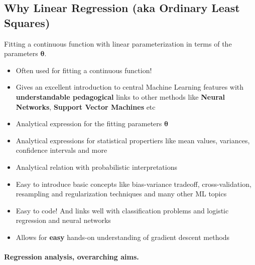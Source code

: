 \documentclass[%
oneside,                 %
final,                   %
10pt]{article}
\begin{document}
\subsection{Why Linear Regression (aka Ordinary Least Squares)}

Fitting a continuous function with linear parameterization in terms of the parameters  $\bm{\theta}$.
\begin{itemize}
\item Often used for fitting a continuous function!

\item Gives an excellent introduction to central Machine Learning features with \textbf{understandable pedagogical} links to other methods like \textbf{Neural Networks}, \textbf{Support Vector Machines} etc

\item Analytical expression for the fitting parameters $\bm{\theta}$

\item Analytical expressions for statistical propertiers like mean values, variances, confidence intervals and more

\item Analytical relation with probabilistic interpretations 

\item Easy to introduce basic concepts like bias-variance tradeoff, cross-validation, resampling and regularization techniques and many other ML topics

\item Easy to code! And links well with classification problems and logistic regression and neural networks

\item Allows for \textbf{easy} hands-on understanding of gradient descent methods
\end{itemize}

\noindent
\paragraph{Regression analysis, overarching aims.}
\end{document}
